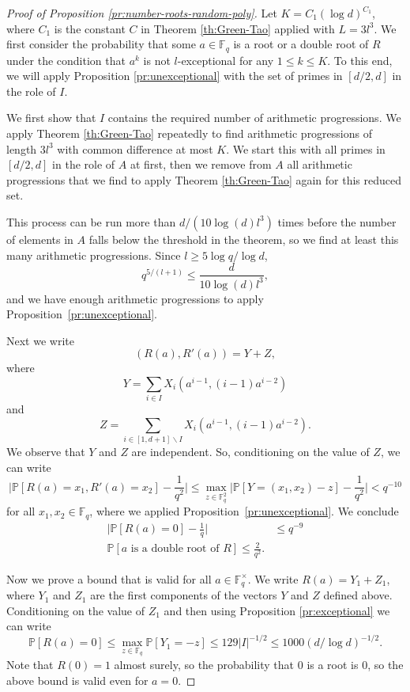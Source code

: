 \documentclass[10pt,a4paper]{amsart}
\def\F{\mathbb F}
\def\P{\mathbb P}
\begin{document}
\begin{proof}[Proof of Proposition \ref{pr:number-roots-random-poly}]
Let $K=C_1(\log d)^{C_1}$,
where $C_1$ is the constant $C$
in Theorem \ref{th:Green-Tao}
applied with $L=3l^3$.
We first consider the probability that some $a\in\F_q$
is a root or a double root of $R$
under the condition that $a^k$ is not $l$-exceptional for any $1\le k\le K$.
To this end, we will apply Proposition \ref{pr:unexceptional} with the set of
primes in $[d/2,d]$ in the role of $I$.


We first show that $I$ contains the required number of arithmetic progressions.
We apply Theorem \ref{th:Green-Tao} repeatedly to find arithmetic progressions
of length $3l^3$ with common difference at most $K$.
We start this with all primes in $[d/2,d]$ in the role of $A$ at first, then
we remove from $A$ all arithmetic progressions that we find to apply
Theorem \ref{th:Green-Tao} again for this reduced set.

This process can be run more than $d/(10\log(d) l^3)$ times before the number
of elements in $A$ falls below the threshold in the theorem, so
we find at least this many arithmetic progressions.
Since $l\ge 5\log q/\log d$,
\[
q^{5/(l+1)}\le \frac{d}{10\log(d) l^3}, 
\]
and we have enough arithmetic progressions to apply Proposition~\ref{pr:unexceptional}.

Next we write
\[
(R(a),R'(a))= Y+Z,
\]
where
\[
Y=\sum_{i\in I}X_{i}(a^{i-1},(i-1)a^{i-2})
\]
and
\[
Z=\sum_{i\in [1,d+1]\backslash I}X_{i}(a^{i-1},(i-1)a^{i-2}).
\]
We observe that $Y$ and $Z$ are independent. So, conditioning on the value of $Z$, we can write
\[
\Big|\P[R(a)=x_1,R'(a)=x_2]-\frac{1}{q^2}\Big|
\le \max_{z\in\F_q^2}\Big|\P[Y=(x_1,x_2)-z]-\frac{1}{q^2}\Big|
< q^{-10}
\]
for all $x_1,x_2\in\F_q$, where we applied Proposition~\ref{pr:unexceptional}.
We conclude
\begin{align}
\Big|\P[R(a)=0]-\frac{1}{q}\Big|&\le q^{-9}\label{eq:unexceptional1}\\
\P[\text{$a$ is a double root of $R$}]\le \frac{2}{q^2}.\label{eq:unexceptional2}
\end{align}

Now we prove a bound that is valid for all $a\in\F_q^{\times}$.
We write $R(a)=Y_1+Z_1$, where $Y_1$ and $Z_1$ are the first components
of the vectors $Y$ and $Z$ defined above.
Conditioning on the value of $Z_1$ and then using
Proposition \ref{pr:exceptional} we can write
\[
\P[R(a)=0]\le \max_{z\in\F_q}\P[Y_1=-z]\le 129 |I|^{-1/2}\le 1000 (d/\log d) ^{-1/2}.
\]
Note that $R(0)=1$ almost surely, so the probability that $0$ is a root is $0$, so
the above bound is valid even for $a=0$.


\end{proof}
\end{document}
